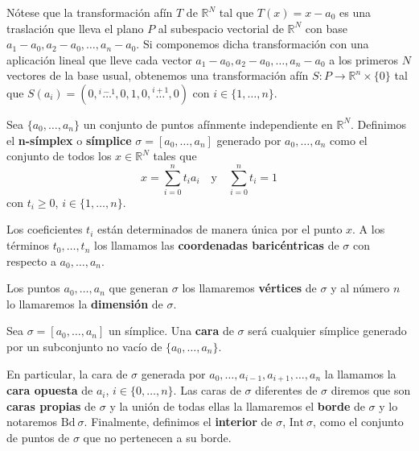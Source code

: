 Nótese que la transformación afín $T$ de $\mathbb{R}^N$ tal que $T(x) = x - a_0$ es una traslación que lleva el plano $P$ al subespacio vectorial de $\mathbb{R}^N$ con base $a_1-a_0, a_2-a_0, \dots, a_n-a_0$. Si componemos dicha transformación con una aplicación lineal que lleve cada vector $a_1-a_0, a_2-a_0, \dots, a_n-a_0$ a los primeros $N$ vectores de la base usual, obtenemos una transformación afín $S: P \rightarrow \mathbb{R}^n \times \{0\}$ tal que $S(a_i) = (0, \overset{i-1}{\dots}, 0, 1, 0, \overset{i+1}{\dots}, 0)$ con $i \in \{1, \dots, n\}$.

\begin{definicion}
	Sea $\{a_0, \dots, a_n\}$ un conjunto de puntos afínmente independiente en 
	$\mathbb{R}^N$. Definimos el \textbf{n-símplex} o \textbf{símplice} $\sigma = [a_0, \dots, a_n]$ 
	generado por $a_0, 	\dots, a_n$ como el conjunto de todos los $x \in \mathbb{R}^N$ 
	tales que
	\[ x=\sum_{i=0}^{n}t_ia_i \quad \text{y} \quad \sum_{i=0}^{n}t_i=1 \]
	con $t_i \geq 0$, $i \in \{1, \dots, n\}$.
\end{definicion}
Los coeficientes $t_i$ están determinados de manera única por el punto $x$. A los términos  
$t_0, \dots, t_n$ los llamamos las \textbf{coordenadas baricéntricas} de $\sigma$
con respecto a $a_0, \dots, a_n$.

Los puntos $a_0, \dots, a_n$ que generan $\sigma$ los llamaremos \textbf{vértices} de $\sigma$
y al número $n$ lo llamaremos la \textbf{dimensión} de $\sigma$.

\begin{definicion}
	Sea $\sigma=[a_0, \dots, a_n]$ un símplice. Una \textbf{cara} de $\sigma$ será cualquier
	símplice generado por un subconjunto no vacío de $\{a_0, \dots, a_n\}$.
\end{definicion}
En particular, la cara de $\sigma$ generada por $a_0, \dots, a_{i-1}, a_{i+1}, \dots, a_n$ la 
llamamos la \textbf{cara opuesta} de $a_i$, $i \in \{0, \dots, n\}$. Las caras de $\sigma$ 
diferentes de $\sigma$ diremos que son \textbf{caras propias} de $\sigma$ y la unión de todas ellas la 
llamaremos el \textbf{borde} de $\sigma$ y lo notaremos $\text{Bd}\ \sigma$. Finalmente, definimos el \textbf{interior} de $\sigma$, $\text{Int}\ \sigma$, como el conjunto de puntos de $\sigma$ que no pertenecen 
a su borde.

